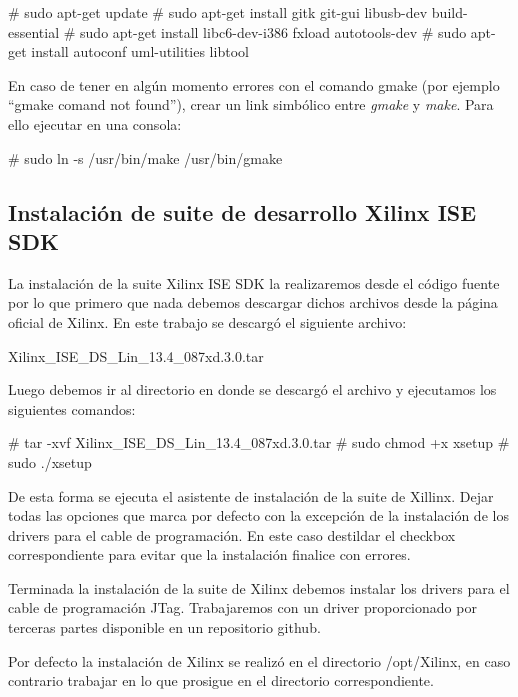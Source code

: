 \begin{bash}
# sudo apt-get update
# sudo apt-get install gitk git-gui libusb-dev build-essential 
# sudo apt-get install libc6-dev-i386 fxload autotools-dev
# sudo apt-get install autoconf uml-utilities libtool
\end{bash}

En caso de tener en algún momento errores con el comando gmake (por ejemplo “gmake comand not found”), crear un link simbólico entre \textit{gmake} y \textit{make}. Para ello ejecutar en una consola:

\begin{bash}
# sudo ln -s /usr/bin/make /usr/bin/gmake
\end{bash}

\subsection{Instalación de suite de desarrollo Xilinx ISE SDK}

La instalación de la suite Xilinx ISE SDK la realizaremos desde el código fuente por lo que primero que nada debemos descargar dichos archivos desde la página oficial de Xilinx. En este trabajo se descarg\'o el siguiente archivo:

\begin{center}
Xilinx\_ISE\_DS\_Lin\_13.4\_087xd.3.0.tar
\end{center}

Luego debemos ir al directorio en donde se descarg\'o el archivo y ejecutamos los siguientes comandos:

\begin{bash}
# tar -xvf Xilinx_ISE_DS_Lin_13.4_087xd.3.0.tar
# sudo chmod +x xsetup
# sudo ./xsetup
\end{bash}

De esta forma se ejecuta el asistente de instalación de la suite de Xillinx. Dejar todas las opciones que marca por defecto con la excepción de la instalación de los drivers para el cable de programación. En este caso destildar el checkbox correspondiente para evitar que la instalación finalice con errores.

Terminada la instalación de la suite de Xilinx debemos instalar los drivers para el cable de programación JTag. Trabajaremos con un driver proporcionado por terceras partes disponible en un repositorio github.

Por defecto la instalación de Xilinx se realizó en el directorio /opt/Xilinx, en caso contrario trabajar en lo que prosigue en el directorio correspondiente. 

